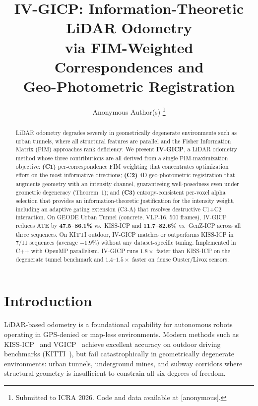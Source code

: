 \documentclass[letterpaper, 10pt, conference]{ieeeconf}
\begin{document}
\title{IV-GICP: Information-Theoretic LiDAR Odometry\\
       via FIM-Weighted Correspondences and\\
       Geo-Photometric Registration}

\author{Anonymous Author(s)%
\thanks{Submitted to ICRA 2026. Code and data available at [anonymous].}}

\maketitle
\thispagestyle{empty}
\pagestyle{empty}

\begin{abstract}
LiDAR odometry degrades severely in geometrically degenerate environments such as
urban tunnels, where all structural features are parallel and the Fisher Information
Matrix (FIM) approaches rank deficiency.
We present \textbf{IV-GICP}, a LiDAR odometry method whose three contributions are
all derived from a single FIM-maximization objective:
\textbf{(C1)} per-correspondence FIM weighting that concentrates optimization effort
on the most informative directions;
\textbf{(C2)} 4D geo-photometric registration that augments geometry with an intensity
channel, guaranteeing well-posedness even under geometric degeneracy (Theorem~1);
and \textbf{(C3)} entropy-consistent per-voxel alpha selection that provides an
information-theoretic justification for the intensity weight, including an adaptive
gating extension (C3-A) that resolves destructive C1+C2 interaction.
On GEODE Urban Tunnel (concrete, VLP-16, 500 frames), IV-GICP reduces ATE by
\textbf{47.5--86.1\%} vs.\ KISS-ICP and \textbf{11.7--82.6\%} vs.\ GenZ-ICP
across all three sequences.
On KITTI outdoor, IV-GICP matches or outperforms KISS-ICP in 7/11 sequences
(average $-1.9\%$) without any dataset-specific tuning.
Implemented in C++ with OpenMP parallelism, IV-GICP runs $1.8\times$ faster than
KISS-ICP on the degenerate tunnel benchmark and $1.4$--$1.5\times$ faster on
dense Ouster/Livox sensors.
\end{abstract}

\section{Introduction}\label{sec:intro}

LiDAR-based odometry is a foundational capability for autonomous robots
operating in GPS-denied or map-less environments.
Modern methods such as KISS-ICP~\cite{vizzo2023kiss} and VGICP~\cite{koide2021voxel}
achieve excellent accuracy on outdoor driving benchmarks (KITTI~\cite{geiger2013kitti}),
but fail catastrophically in geometrically degenerate environments:
urban tunnels, underground mines, and subway corridors where structural geometry
is insufficient to constrain all six degrees of freedom.
\end{document}
